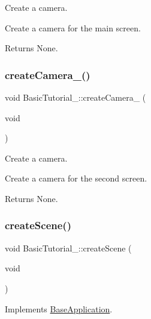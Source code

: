Create a camera. 

Create a camera for the main screen.

\begin{DoxyReturn}{Returns}
None. 
\end{DoxyReturn}
\mbox{\label{class_basic_tutorial__00_a8745a127adeb69fa769f832fd41412c0}} 
\subsubsection{\texorpdfstring{create\+Camera\+\_()}{createCamera\_01()}}
{\footnotesize\ttfamily void Basic\+Tutorial\+\_\+::create\+Camera\+\_ (\begin{DoxyParamCaption}\item[{void}]{ }\end{DoxyParamCaption})\hspace{0.3cm}{\ttfamily [protected]}}



Create a camera. 

Create a camera for the second screen.

\begin{DoxyReturn}{Returns}
None. 
\end{DoxyReturn}
\mbox{\label{class_basic_tutorial__00_a15a3d4673724ec99077ce992f996a550}} 
\subsubsection{\texorpdfstring{create\+Scene()}{createScene()}}
{\footnotesize\ttfamily void Basic\+Tutorial\+\_\+::create\+Scene (\begin{DoxyParamCaption}\item[{void}]{ }\end{DoxyParamCaption})\hspace{0.3cm}{\ttfamily [virtual]}}



Implements \mbox{\hyperlink{class_base_application_aa97beeb4059b17d0ec22eae33286ec2d}{Base\+Application}}.

